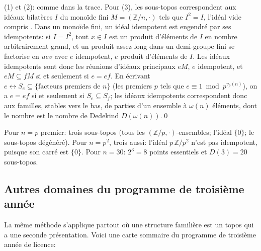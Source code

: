 \direct{} (1) et (2): comme dans la trace. Pour (3), les sous-topos correspondent aux idéaux bilatères $I$ du monoïde fini $M = (\mathbb Z/n,\cdot)$ tels que $I^2 = I$, l'idéal vide compris \cite[Prop.~6.1.2]{pirashvili-jncg}. Dans un monoïde fini, un idéal idempotent est engendré par ses idempotents: si $I = I^2$, tout $x\in I$ est un produit d'éléments de $I$ en nombre arbitrairement grand, et un produit assez long dans un demi-groupe fini se factorise en $uev$ avec $e$ idempotent, $e$ produit d'éléments de $I$. Les idéaux idempotents sont donc les réunions d'idéaux principaux $eM$, $e$ idempotent, et $eM\subseteq fM$ si et seulement si $e = ef$. En écrivant $e\leftrightarrow S_e\subseteq\{\text{facteurs premiers de }n\}$ (les premiers $p$ tels que $e\equiv 1\bmod p^{v_p(n)}$), on a $e = ef$ si et seulement si $S_e\subseteq S_f$; les idéaux idempotents correspondent donc aux familles, stables vers le bas, de parties d'un ensemble à $\omega(n)$ éléments, dont le nombre est le nombre de Dedekind $D(\omega(n))$.\qed

\begin{example}
Pour $n = p$ premier: trois sous-topos (tous les $(\mathbb Z/p,\cdot)$-ensembles; l'idéal $\{0\}$; le sous-topos dégénéré). Pour $n = p^2$, trois aussi: l'idéal $p\,\mathbb Z/p^2$ n'est pas idempotent, puisque son carré est $\{0\}$. Pour $n = 30$: $2^3 = 8$ points essentiels et $D(3) = 20$ sous-topos.
\end{example}

\subsection{Autres domaines du programme de troisième année}

La même méthode s'applique partout où une structure familière est un topos qui a une seconde présentation. Voici une carte sommaire du programme de troisième année de licence:

